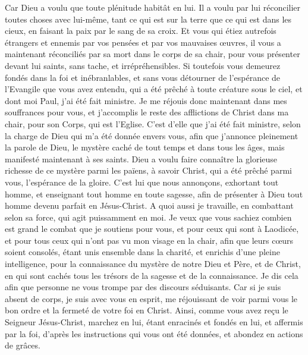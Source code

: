 \begin{multicols}{2}
Car Dieu a voulu que toute plénitude habitât en lui.
Il a voulu par lui réconcilier toutes choses avec lui-même, tant ce qui est sur la terre que ce qui est dans les cieux, en faisant la paix par le sang de sa croix.
Et vous qui étiez autrefois étrangers et ennemis par vos pensées et par vos mauvaises œuvres, il vous a maintenant réconciliés par sa mort dans le corps de sa chair,
pour vous présenter devant lui saints, sans tache, et irrépréhensibles.
Si toutefois vous demeurez fondés dans la foi et inébranlables, et sans vous détourner de l'espérance de l'Evangile que vous avez entendu, qui a été prêché à toute créature sous le ciel, et dont moi Paul, j'ai été fait ministre.
Je me réjouis donc maintenant dans mes souffrances pour vous, et j'accomplis le reste des afflictions de Christ dans ma chair, pour son Corps, qui est l'Eglise.
C’est d’elle que j'ai été fait ministre, selon la charge de Dieu qui m'a été donnée envers vous, afin que j’annonce pleinement la parole de Dieu,
le mystère caché de tout temps et dans tous les âges, mais manifesté maintenant à ses saints.
Dieu a voulu faire connaître la glorieuse richesse de ce mystère parmi les païens, à savoir Christ, qui a été prêché parmi vous, l'espérance de la gloire.
C’est lui que nous annonçons, exhortant tout homme, et enseignant tout homme en toute sagesse, afin de présenter à Dieu tout homme devenu parfait en Jésus-Christ.
A quoi aussi je travaille, en combattant selon sa force, qui agit puissamment en moi.
\VerseOne{}Je veux que vous sachiez combien est grand le combat que je soutiens pour vous, et pour ceux qui sont à Laodicée, et pour tous ceux qui n'ont pas vu mon visage en la chair,
afin que leurs cœurs soient consolés, étant unis ensemble dans la charité, et enrichis d'une pleine intelligence, pour la connaissance du mystère de notre Dieu et Père, et de Christ,
en qui sont cachés tous les trésors de la sagesse et de la connaissance.
Je dis cela afin que personne ne vous trompe par des discours séduisants.
Car si je suis absent de corps, je suis avec vous en esprit, me réjouissant de voir parmi vous le bon ordre et la fermeté de votre foi en Christ.
Ainsi, comme vous avez reçu le Seigneur Jésus-Christ, marchez en lui,
étant enracinés et fondés en lui, et affermis par la foi, d’après les instructions qui vous ont été données, et abondez en actions de grâces.

\end{multicols}
